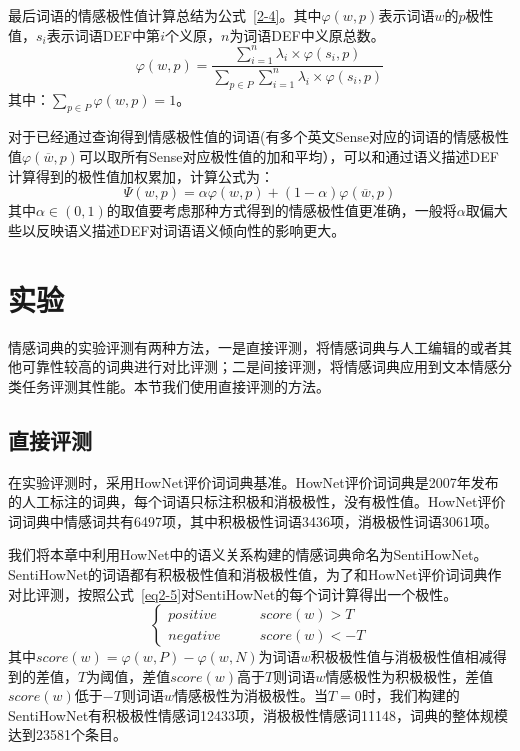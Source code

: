 最后词语的情感极性值计算总结为公式~\ref{2-4}。其中$\varphi(w,p)$表示词语$w$的$p$极性值，$s_i$表示词语DEF中第$i$个义原，$n$为词语DEF中义原总数。
\begin{equation}
\label{2-4}
\varphi(w,p)=\dfrac{\sum_{i=1}^n\lambda_i\times\varphi(s_i,p)}{\sum_{p\in P}\sum_{i=1}^n\lambda_i\times\varphi(s_i,p)}
\end{equation}
其中：$\sum_{p \in P}\varphi(w,p)=1$。

对于已经通过查询得到情感极性值的词语(有多个英文Sense对应的词语的情感极性值$\varphi(\overline{w},p)$可以取所有Sense对应极性值的加和平均），可以和通过语义描述DEF计算得到的极性值加权累加，计算公式为：
\begin{equation}
\Psi(w,p)=\alpha \varphi(w,p)+(1-\alpha)\varphi(\overline{w},p)
\end{equation}
其中$ \alpha \in (0,1)$的取值要考虑那种方式得到的情感极性值更准确，一般将$ \alpha $取偏大些以反映语义描述DEF对词语语义倾向性的影响更大。

\section{实验}
情感词典的实验评测有两种方法，一是直接评测，将情感词典与人工编辑的或者其他可靠性较高的词典进行对比评测；二是间接评测，将情感词典应用到文本情感分类任务评测其性能。本节我们使用直接评测的方法。

\subsection{直接评测}
在实验评测时，采用HowNet评价词词典基准。HowNet评价词词典是2007年发布的人工标注的词典，每个词语只标注积极和消极极性，没有极性值。HowNet评价词词典中情感词共有6497项，其中积极极性词语3436项，消极极性词语3061项。

我们将本章中利用HowNet中的语义关系构建的情感词典命名为SentiHowNet。SentiHowNet的词语都有积极极性值和消极极性值，为了和HowNet评价词词典作对比评测，按照公式~\ref{eq2-5}对SentiHowNet的每个词计算得出一个极性。
\begin{equation}
\label{eq2-5}
\begin{cases}
positive \qquad & score(w)>T\\
negative \qquad & score(w)<-T
\end{cases}
\end{equation}
其中$ score(w)= \varphi(w,P)-\varphi(w,N)$为词语$ w $积极极性值与消极极性值相减得到的差值，$ T $为阈值，差值$ score(w)$高于$ T $则词语$ w $情感极性为积极极性，差值$ score(w)$低于$ -T $则词语$ w $情感极性为消极极性。当$ T=0 $时，我们构建的SentiHowNet有积极极性情感词12433项，消极极性情感词11148，词典的整体规模达到23581个条目。

